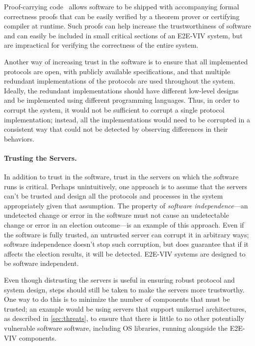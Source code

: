 Proof-carrying code~\cite{Necula02} allows software to be shipped with
accompanying formal correctness proofs that can be easily verified by
a theorem prover or certifying compiler at runtime. Such proofs can
help increase the trustworthiness of software and can easily be
included in small critical sections of an E2E-VIV system, but are
impractical for verifying the correctness of the entire system.

Another way of increasing trust in the software is to ensure that all
implemented protocols are open, with publicly available
specifications, and that multiple redundant implementations of the
protocols are used throughout the system. Ideally, the redundant
implementations should have different low-level designs and be
implemented using different programming languages. Thus, in order to
corrupt the system, it would not be sufficient to corrupt a single
protocol implementation; instead, all the implementations would need
to be corrupted in a consistent way that could not be detected by
observing differences in their behaviors.

\paragraph{Trusting the Servers.} In addition to trust in the
software, trust in the servers on which the software runs is
critical. Perhaps unintuitively, one approach is to assume that the
servers can't be trusted and design all the protocols and processes in
the system appropriately given that assumption. The property of
\emph{software independence}---an undetected change or error in the
software must not cause an undetectable change or error in an election
outcome---is an example of this approach. Even if the software is
fully trusted, an untrusted server can corrupt it in arbitrary ways;
software independence doesn't stop such corruption, but does guarantee
that if it affects the election results, it will be detected.  E2E-VIV
systems are designed to be software independent.

Even though distrusting the servers is useful in ensuring robust
protocol and system design, steps should still be taken to make the
servers more trustworthy.  One way to do this is to minimize the
number of components that must be trusted; an example would be using
servers that support unikernel architectures, as described in
\autoref{sec:threats}, to ensure that there is little to no other
potentially vulnerable software software, including OS libraries,
running alongside the E2E-VIV components.

